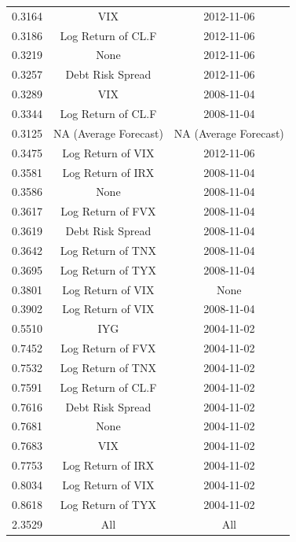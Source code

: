 \documentclass[11pt,3p,review,authoryear]{elsarticle}
\theoremstyle{definition}
\begin{document}
\begin{table}[ht]
\begin{tabular}{ccc}
  0.3164 & VIX & 2012-11-06 \\ 
  0.3186 & Log Return of CL.F & 2012-11-06 \\ 
  0.3219 & None & 2012-11-06 \\ 
  0.3257 & Debt Risk Spread & 2012-11-06 \\ 
  0.3289 & VIX & 2008-11-04 \\ 
  0.3344 & Log Return of CL.F & 2008-11-04 \\ 
  \rowcolor{gray}0.3125 & NA (Average Forecast) & NA (Average Forecast)\\
  0.3475 & Log Return of VIX & 2012-11-06 \\ 
  0.3581 & Log Return of IRX & 2008-11-04 \\ 
  0.3586 & None & 2008-11-04 \\ 
  0.3617 & Log Return of FVX & 2008-11-04 \\ 
  0.3619 & Debt Risk Spread & 2008-11-04 \\ 
  0.3642 & Log Return of TNX & 2008-11-04 \\ 
  0.3695 & Log Return of TYX & 2008-11-04 \\ 
  0.3801 & Log Return of VIX & None \\ 
  0.3902 & Log Return of VIX & 2008-11-04 \\ 
  0.5510 & IYG & 2004-11-02 \\ 
  0.7452 & Log Return of FVX & 2004-11-02 \\ 
  0.7532 & Log Return of TNX & 2004-11-02 \\ 
  0.7591 & Log Return of CL.F & 2004-11-02 \\ 
  0.7616 & Debt Risk Spread & 2004-11-02 \\ 
  0.7681 & None & 2004-11-02 \\ 
  0.7683 & VIX & 2004-11-02 \\ 
  0.7753 & Log Return of IRX & 2004-11-02 \\ 
  0.8034 & Log Return of VIX & 2004-11-02 \\ 
  0.8618 & Log Return of TYX & 2004-11-02 \\ 
      \rowcolor{red} 2.3529 & All & All \\
       \hline
    \end{tabular}
    
    \endgroup
    \end{table}
\end{document}
